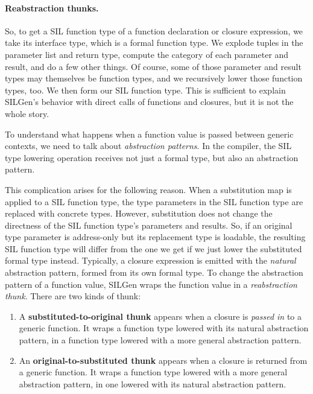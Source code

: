 \documentclass[../generics]{subfiles}
\begin{document}
\paragraph{Reabstraction thunks.}
So, to get a SIL function type of a function declaration or closure expression, we take its interface type, which is a formal function type. We explode tuples in the parameter list and return type, compute the category of each parameter and result, and do a few other things. Of course, some of those parameter and result types may themselves be function types, and we recursively lower those function types, too. We then form our SIL function type. This is sufficient to explain SILGen's behavior with direct calls of functions and closures, but it is not the whole story.

To understand what happens when a function value is passed between generic contexts, we need to talk about \emph{abstraction patterns}. In the compiler, the SIL type lowering operation receives not just a formal type, but also an abstraction pattern.

This complication arises for the following reason. When a substitution map is applied to a SIL function type, the type parameters in the SIL function type are replaced with concrete types. However, substitution does not change the directness of the SIL function type's parameters and results. So, if an original type parameter is address-only but its replacement type is loadable, the resulting SIL function type will differ from the one we get if we just lower the substituted formal type instead. Typically, a closure expression is emitted with the \emph{natural} abstraction pattern, formed from its own formal type. To change the abstraction pattern of a function value, SILGen wraps the function value in a \emph{reabstraction thunk}. There are two kinds of thunk:
\begin{enumerate}
\item A \textbf{substituted-to-original thunk} appears when a closure is \emph{passed in} to a generic function. It wraps a function type lowered with its natural abstraction pattern, in a function type lowered with a more general abstraction pattern.
\item An \textbf{original-to-substituted thunk} appears when a closure is {returned} from a generic function. It wraps a function type lowered with a more general abstraction pattern, in one lowered with its natural abstraction pattern.
\end{enumerate}
\end{document}
